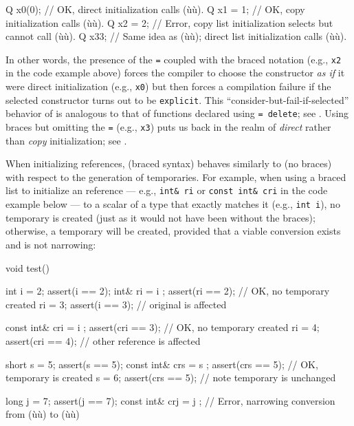 \begin{emcppslisting}
Q x0(0);     // OK, direct initialization calls (ù{}ù).
Q x1 = 1;    // OK, copy initialization calls (ù{}ù).
Q x2 = {2};  // Error, copy list initialization selects but cannot call (ù{}ù).
Q x3{3};     // Same idea as (ù{}ù); direct list initialization calls (ù{}ù).
\end{emcppslisting}


\noindent In other words, the presence of the \lstinline!=! coupled with the braced
notation (e.g., \lstinline!x2! in the code example above) forces the
compiler to choose the constructor \emph{as if} it were direct
initialization (e.g., \lstinline!x0!) but then forces a compilation failure
if the selected constructor turns out to be \lstinline!explicit!. This
``consider-but-fail-if-selected'' behavior of  is analogous to that of functions declared using
\lstinline!=!~\lstinline!delete!; see . Using
braces but omitting the \lstinline!=! (e.g., \lstinline!x3!) puts us back in
the realm of \emph{direct} rather than \emph{copy} initialization; see
.

When initializing references,  (braced
syntax) behaves similarly to  (no braces)
with respect to the generation of temporaries. For example, when using a
braced list to initialize an  reference --- e.g.,
\lstinline!int&!~\lstinline!ri! or \lstinline!const!~\lstinline!int&!~\lstinline!cri!
in the code example below --- to a scalar of a type that exactly matches
it (e.g., \lstinline!int!~\lstinline!i!), no temporary is created (just as it
would not have been without the braces); otherwise, a temporary will be
created, provided that a viable conversion exists and is not narrowing:

\begin{emcppslisting}
void test()
{
    int  i = 2;               assert(i   == 2);
    int& ri = { i };          assert(ri  == 2);  // OK, no temporary created
    ri = 3;                   assert(i   == 3);  // original is affected

    const int& cri = { i };   assert(cri == 3);  // OK, no temporary created
    ri = 4;                   assert(cri == 4);  // other reference is affected

    short s = 5;              assert(s   == 5);
    const int& crs = { s };   assert(crs == 5);  // OK, temporary is created
    s = 6;                    assert(crs == 5);  // note temporary is unchanged

    long j = 7;               assert(j   == 7);
    const int& crj = { j };   // Error, narrowing conversion from (ù{}ù) to (ù{}ù)
}
\end{emcppslisting}


